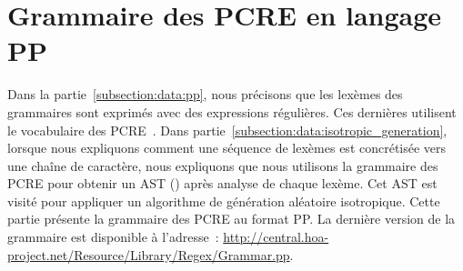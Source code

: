 \section{Grammaire des PCRE en langage PP}
\label{appendices:grammar_of_pcre}

Dans la partie~\ref{subsection:data:pp}, nous précisons que les lexèmes des
grammaires sont exprimés avec des expressions régulières. Ces dernières
utilisent le vocabulaire des PCRE~. Dans
partie~\ref{subsection:data:isotropic_generation}, lorsque nous expliquons
comment une séquence de lexèmes est concrétisée vers une chaîne de caractère,
nous expliquons que nous utilisons la grammaire des PCRE pour obtenir un AST
() après analyse de chaque lexème. Cet AST est
visité pour appliquer un algorithme de génération aléatoire isotropique. Cette
partie présente la grammaire des PCRE au format PP. La dernière version de la
grammaire est disponible à l'adresse~:
\url{http://central.hoa-project.net/Resource/Library/Regex/Grammar.pp}.

